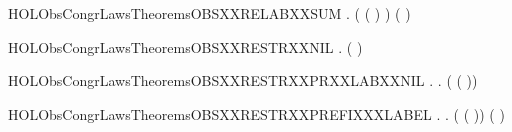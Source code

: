 \newcommand{\HOLObsCongrLawsTheoremsOBSXXRELABXXPREFIX}{\UseVerbatim{HOLObsCongrLawsTheoremsOBSXXRELABXXPREFIX}}
\begin{SaveVerbatim}{HOLObsCongrLawsTheoremsOBSXXRELABXXSUM}
\HOLTokenTurnstile{} \HOLSymConst{\HOLTokenForall{}}  .
        ( ( \HOLSymConst{\ensuremath{+}} ) ) (   \HOLSymConst{\ensuremath{+}}   )
\end{SaveVerbatim}
\newcommand{\HOLObsCongrLawsTheoremsOBSXXRELABXXSUM}{\UseVerbatim{HOLObsCongrLawsTheoremsOBSXXRELABXXSUM}}
\begin{SaveVerbatim}{HOLObsCongrLawsTheoremsOBSXXRESTRXXNIL}
\HOLTokenTurnstile{} \HOLSymConst{\HOLTokenForall{}}.  (\HOLConst{\ensuremath{\nu}}  ) 
\end{SaveVerbatim}
\newcommand{\HOLObsCongrLawsTheoremsOBSXXRESTRXXNIL}{\UseVerbatim{HOLObsCongrLawsTheoremsOBSXXRESTRXXNIL}}
\begin{SaveVerbatim}{HOLObsCongrLawsTheoremsOBSXXRESTRXXPRXXLABXXNIL}
\HOLTokenTurnstile{} \HOLSymConst{\HOLTokenForall{}} .
        \HOLConst{\HOLTokenIn{}}  \HOLSymConst{\HOLTokenDisj{}}   \HOLConst{\HOLTokenIn{}}  \HOLSymConst{\HOLTokenImp{}}
       \HOLSymConst{\HOLTokenForall{}}.  (\HOLConst{\ensuremath{\nu}}  ( )) 
\end{SaveVerbatim}
\newcommand{\HOLObsCongrLawsTheoremsOBSXXRESTRXXPRXXLABXXNIL}{\UseVerbatim{HOLObsCongrLawsTheoremsOBSXXRESTRXXPRXXLABXXNIL}}
\begin{SaveVerbatim}{HOLObsCongrLawsTheoremsOBSXXRESTRXXPREFIXXXLABEL}
\HOLTokenTurnstile{} \HOLSymConst{\HOLTokenForall{}} .
        \HOLConst{\HOLTokenNotIn{}}  \HOLSymConst{\HOLTokenConj{}}   \HOLConst{\HOLTokenNotIn{}}  \HOLSymConst{\HOLTokenImp{}}
       \HOLSymConst{\HOLTokenForall{}}.  (\HOLConst{\ensuremath{\nu}}  ( )) ( \HOLConst{\ensuremath{\nu}}  )
\end{SaveVerbatim}
